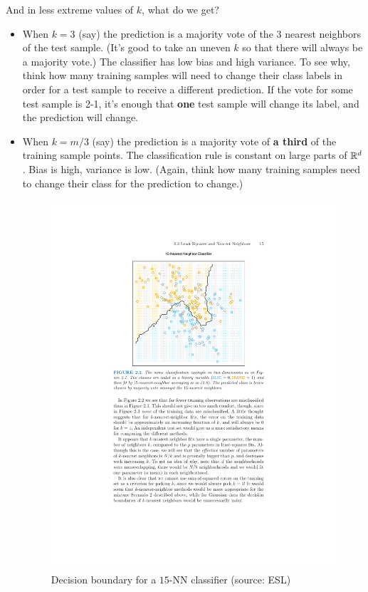 And in less extreme values of $k$, what do we get?
\begin{itemize}
  \item 
    When $k=3$ (say) the prediction is a majority vote of the 3 nearest
    neighbors of the test sample. (It's good to take an uneven $k$ so that there
    will always be a majority vote.) 
The
classifier has low bias and high variance. To see why, think how many training
samples will need to change their class labels in order for a test sample to
receive a different prediction. If the vote for some test sample is 2-1, it's
enough that {\bf one} test sample will change its label, and the prediction will
change. 

\item When $k=m/3$ (say)  the prediction is a majority vote of {\bf a third} of the
  training sample points. The classification rule is constant on large parts of
  $\mathbb{R}^d$. Bias is high, variance is low. (Again, think how many training samples
  need to change their class for the prediction to change.) 

  \begin{figure}[h!]
  \centering
  \includegraphics{esl_15_nn.pdf}
  \caption{Decision boundary for a $15$-NN classifier (source: ESL)}
\end{figure}

\end{itemize}

